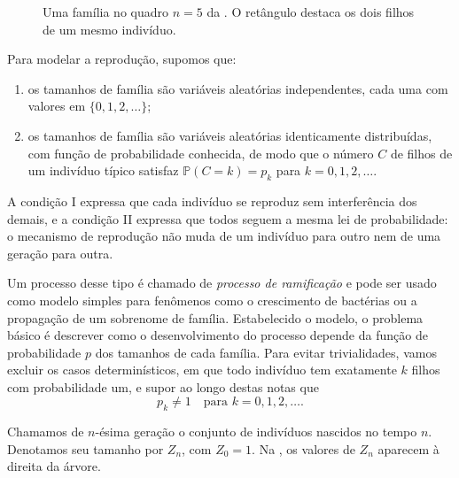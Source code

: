 \documentclass[12pt,portuguese]{article}
\theoremstyle{definition}
\theoremstyle{plainexercise}
\theoremstyle{starredexercise}
\theoremstyle{definition}
\begin{document}
\begin{figure}[H]
  \centering
  \caption{Uma família no quadro $n=5$ da .
    O retângulo destaca os dois filhos de um mesmo indivíduo.}
  \label{fig:familia-ramificacao}
\end{figure}

Para modelar a reprodução, supomos que:
\begin{enumerate}[label=\Roman*.]
  \item os tamanhos de família são variáveis aleatórias independentes,
        cada uma com valores em $\{0,1,2,\ldots\}$;
  \item os tamanhos de família são variáveis aleatórias identicamente
        distribuídas, com função de probabilidade conhecida, de modo
        que o número $C$ de filhos de um indivíduo típico satisfaz
        $\mathbb{P}(C=k)=p_k$ para $k=0,1,2,\ldots$.
\end{enumerate}
A condição I expressa que cada indivíduo se reproduz sem interferência dos
demais, e a condição II expressa que todos seguem a mesma lei de
probabilidade: o mecanismo de reprodução não muda de um indivíduo para
outro nem de uma geração para outra.

\medskip 

Um processo desse tipo é chamado de \emph{processo de ramificação} e pode
ser usado como modelo simples para fenômenos como o crescimento de
bactérias ou a propagação de um sobrenome de família. Estabelecido o
modelo, o problema básico é descrever como o desenvolvimento do processo
depende da função de probabilidade $p$ dos tamanhos de cada família. 
Para evitar trivialidades, vamos excluir os casos
determinísticos, em que todo indivíduo tem exatamente $k$ filhos com
probabilidade um, e supor ao longo destas notas que
\[
p_k\neq 1
\quad\text{para } k=0,1,2,\ldots.
\]

Chamamos de $n$-ésima geração o conjunto de indivíduos nascidos no tempo
$n$. Denotamos seu tamanho por $Z_n$, com $Z_0=1$. Na
, os valores de $Z_n$ aparecem à direita da árvore.
\end{document}
